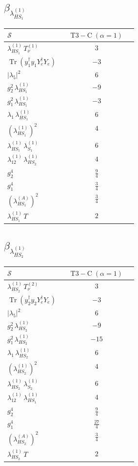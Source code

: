 \documentclass[9pt]{article}
\begin{document}
\subsection*{$ \beta_{\lambda_{HS_1}^{(1)}} $}
\begin{longtable}{@{}p{0.31\linewidth}c@{}}
\toprule
$\mathcal{S}$ & $ \mathrm{T3-C}\;(\alpha=1) $ \\
\midrule
$ \lambda_{HS_1}^{(1)}\,T_{\nu}^{(1)} $ & $ 3 $ \\
$ \operatorname{Tr}(y_1^\dagger y_1Y_e^\dagger Y_e) $ & $ -3 $ \\
$ |\lambda_5|^2 $ & $ 6 $ \\
$ g_2^2\,\lambda_{HS_1}^{(1)} $ & $ -9 $ \\
$ g_1^2\,\lambda_{HS_1}^{(1)} $ & $ -3 $ \\
$ \lambda_1\,\lambda_{HS_1}^{(1)} $ & $ 6 $ \\
$ \left(\lambda_{HS_1}^{(1)}\right)^2 $ & $ 4 $ \\
$ \lambda_{HS_1}^{(1)}\,\lambda_{S_1}^{(1)} $ & $ 6 $ \\
$ \lambda_{12}^{(1)}\,\lambda_{HS_2}^{(1)} $ & $ 4 $ \\
$ g_2^4 $ & $ \frac{9}{4} $ \\
$ g_1^4 $ & $ \frac{3}{4} $ \\
$ \left(\lambda_{HS_1}^{(A)}\right)^2 $ & $ \frac{3}{4} $ \\
$ \lambda_{HS_1}^{(1)}\,T $ & $ 2 $ \\
\bottomrule
\end{longtable}
\subsection*{$ \beta_{\lambda_{HS_2}^{(1)}} $}
\begin{longtable}{@{}p{0.31\linewidth}c@{}}
\toprule
$\mathcal{S}$ & $ \mathrm{T3-C}\;(\alpha=1) $ \\
\midrule
$ \lambda_{HS_2}^{(1)}\,T_{\nu}^{(2)} $ & $ 3 $ \\
$ \operatorname{Tr}(y_2^\dagger y_2Y_e^\dagger Y_e) $ & $ -3 $ \\
$ |\lambda_5|^2 $ & $ 6 $ \\
$ g_2^2\,\lambda_{HS_2}^{(1)} $ & $ -9 $ \\
$ g_1^2\,\lambda_{HS_2}^{(1)} $ & $ -15 $ \\
$ \lambda_1\,\lambda_{HS_2}^{(1)} $ & $ 6 $ \\
$ \left(\lambda_{HS_2}^{(1)}\right)^2 $ & $ 4 $ \\
$ \lambda_{HS_2}^{(1)}\,\lambda_{S_2}^{(1)} $ & $ 6 $ \\
$ \lambda_{12}^{(1)}\,\lambda_{HS_1}^{(1)} $ & $ 4 $ \\
$ g_2^4 $ & $ \frac{9}{4} $ \\
$ g_1^4 $ & $ \frac{27}{4} $ \\
$ \left(\lambda_{HS_2}^{(A)}\right)^2 $ & $ \frac{3}{4} $ \\
$ \lambda_{HS_2}^{(1)}\,T $ & $ 2 $ \\
\bottomrule
\end{longtable}
\end{document}
